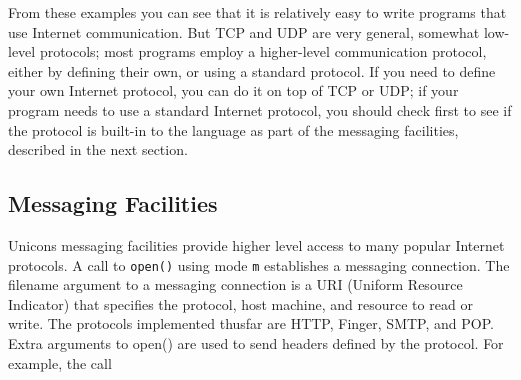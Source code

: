 
From these examples you can see that it is relatively easy to write
programs that use Internet communication. But TCP and UDP are very
general, somewhat low-level protocols; most programs employ a
higher-level communication protocol, either by defining their own, or
using a standard protocol. If you need to define your own Internet
protocol, you can do it on top of TCP or UDP; if your program needs to
use a standard Internet protocol, you should check first to see if the
protocol is built-in to the language as part of the messaging
facilities, described in the next section.

\subsection{Messaging Facilities}

Unicon{\textquotesingle}s messaging facilities provide
higher level access to many popular Internet protocols. A call to
\texttt{open()} using mode \texttt{{\textquotedbl}m{\textquotedbl}}
establishes a messaging connection. The filename argument to a
messaging connection is a URI (Uniform Resource Indicator) that
specifies the protocol, host machine, and resource to read or write.
The protocols implemented thusfar are HTTP, Finger, SMTP, and POP.
Extra arguments to open() are used to send headers defined by the
protocol. For example, the call

